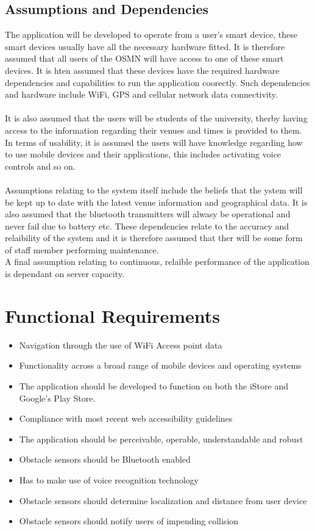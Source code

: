 \documentclass{article}
\begin{document}
	\subsection{Assumptions and Dependencies}
		The application will be developed to operate from a user's smart device, these smart devices usually have all the necessary hardware fitted. It is therefore assumed that all users of the OSMN will have access to one of these smart devices. It is hten assumed that these devices have the required hardware dependencies and capabilities to run the application coorectly. Such dependencies and hardware include WiFi, GPS and cellular network data connectivity.\\ \\
		It is also assumed that the users will be students of the university, therby having access to the information regarding their venues and times is provided to them.\\
		In terms of usability, it is assumed the users will have knowledge regarding how to use mobile devices and their applications, this includes activating voice controls and so on. \\ \\
		Assumptions relating to the system itself include the beliefs that the ystem will be kept up to date with the latest venue information and geographical data. It is also assumed that the bluetooth transmitters will alwasy be operational and never fail due to battery etc. These dependencies relate to the accuracy and relaibility of the system and it is therefore assumed that ther will be some form of staff member performing maintenance.\\
		A final assumption relating to continuous, relaible performance of the application is dependant on server capacity.
		
		
		

\newpage
\section{Functional Requirements}
\begin{itemize}
	\item Navigation through the use of WiFi Access point data
	\item Functionality across a broad range of mobile devices and operating systems
	\item The application should be developed to function on both the iStore and Google's Play Store.
	\item Compliance with most recent web accessibility guidelines
	\item The application should be perceivable, operable, understandable and robust
	\item Obstacle sensors should be Bluetooth enabled
	\item Has to make use of voice recognition technology
	\item Obstacle sensors should determine localization and distance from user device
	\item Obstacle sensors should notify users of impending collision
\end{itemize}
\end{document}
